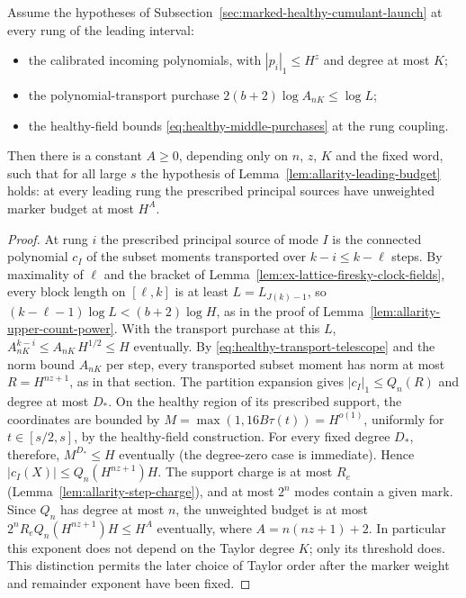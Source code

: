 \begin{lemma}
\label{lem:allarity-principal-power}
Assume the hypotheses of Subsection~\ref{sec:marked-healthy-cumulant-launch}
at every rung of the leading interval:
\begin{itemize}
\item the calibrated incoming polynomials, with $|p_i|_1\le H^z$ and
 degree at most $K$;
\item the polynomial-transport purchase $2(b+2)\log A_{nK}\le\log L$;
\item the healthy-field bounds \eqref{eq:healthy-middle-purchases} at the
 rung coupling.
\end{itemize}
Then there is a constant $A\ge0$, depending only on $n$, $z$, $K$ and the
fixed word, such that for all large $s$ the hypothesis of
Lemma~\ref{lem:allarity-leading-budget} holds: at every leading rung the
prescribed principal sources have unweighted marker budget at most $H^A$.
\end{lemma}
\begin{proof}
At rung $i$ the prescribed principal source of mode $I$ is the connected
polynomial $c_I$ of the subset moments transported over $k-i\le k-\ell$
steps. By maximality of $\ell$ and the bracket of
Lemma~\ref{lem:ex-lattice-firesky-clock-fields}, every block length on
$[\ell,k]$ is at least $L=L_{J(k)-1}$, so
$(k-\ell-1)\log L<(b+2)\log H$, as in the proof of
Lemma~\ref{lem:allarity-upper-count-power}. With the transport purchase at
this $L$, $A_{nK}^{k-i}\le A_{nK}\,H^{1/2}\le H$ eventually. By
\eqref{eq:healthy-transport-telescope} and the norm bound $A_{nK}$ per step,
every transported subset moment has norm at most $R=H^{nz+1}$, as in that
section. The partition expansion gives $|c_I|_1\le Q_n(R)$ and degree at
most $D_*$. On the healthy region of its prescribed support, the
coordinates are bounded by $M=\max(1,16B\tau(t))=H^{o(1)}$,
uniformly for $t\in[s/2,s]$, by the healthy-field construction.
For every fixed degree $D_*$, therefore, $M^{D_*}\le H$ eventually
(the degree-zero case is immediate). Hence
$|c_I(X)|\le Q_n(H^{nz+1})H$. The support charge is at most $R_e$
(Lemma~\ref{lem:allarity-step-charge}), and at most $2^n$ modes contain
a given mark. Since $Q_n$ has degree at most $n$, the unweighted
budget is at most $2^nR_eQ_n(H^{nz+1})H\le H^A$ eventually, where
$A=n(nz+1)+2$. In particular this exponent does not depend on the
Taylor degree $K$; only its threshold does. This distinction permits
the later choice of Taylor order after the marker weight and remainder
exponent have been fixed.
\end{proof}

